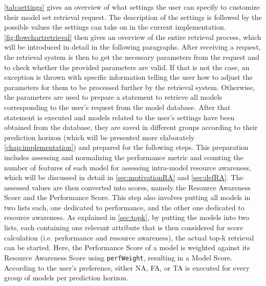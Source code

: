 \autoref{tab:settings} gives an overview of what settings the user can specify to customize their model set retrieval request. The description of the settings is followed by the possible values the settings can take on in the current implementation. \autoref{fig:flowchartretrieval} then gives an overview of the entire retrieval process, which will be introduced in detail in the following paragraphs. After receiving a request, the retrieval system is then to get the necessary parameters from the request and to check whether the provided parameters are valid. If that is not the case, an exception is thrown with specific information telling the user how to adjust the parameters for them to be processed further by the retrieval system. Otherwise, the parameters are used to prepare a statement to retrieve all models corresponding to the user's request from the model database. After that statement is executed and models related to the user's settings have been obtained from the database, they are saved in different groups according to their prediction horizon (which will be presented more elaborately \autoref{chap:implementation}) and prepared for the following steps. This preparation includes assessing and normalizing the performance metric and counting the number of features of each model for assessing intra-model resource awareness, which will be discussed in detail in \autoref{sec:motivationRA} and \autoref{sec:defRA}. The assessed values are then converted into scores, namely the Resource Awareness Score and the Performance Score. This step also involves putting all models in two lists each, one dedicated to performance, and the other one dedicated to resource awareness. As explained in \autoref{sec:topk}, by putting the models into two lists, each containing one relevant attribute that is then considered for score calculation (i.e. performance and resource awareness), the actual top-k retrieval can be started. Here, the Performance Score of a model is weighted against its Resource Awareness Score using \texttt{perfWeight}, resulting in a Model Score. According to the user's preference, either NA, FA, or TA is executed for every group of models per prediction horizon.


